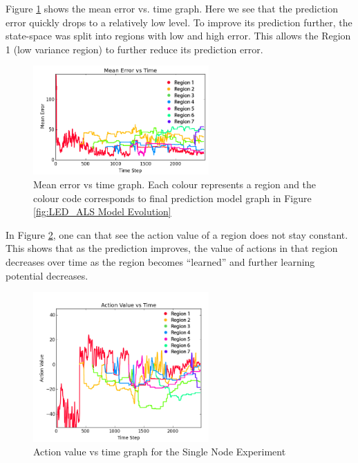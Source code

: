 Figure \ref{fig:LED_ALS Mean Error vs Time} shows the mean error vs. time graph. Here we see that the prediction error quickly drops to a relatively low level. To improve its prediction further, the state-space was split into regions with low and high error. This allows the Region 1 (low variance region) to further reduce its prediction error.

\begin{figure} 
	\centering
	\includegraphics[width=0.6\textwidth]{"fig/validations/LED_ALS Mean Error vs Time"}
	\caption[Mean error vs time graph]{Mean error vs time graph. Each colour represents a region and the colour code corresponds to final prediction model graph in Figure \ref{fig:LED_ALS Model Evolution} }
	\label{fig:LED_ALS Mean Error vs Time}
\end{figure}


In Figure \ref{fig:LED_ALS Action Value vs Time}, one can that see the action value of a region does not stay constant. This shows that as the prediction improves, the value of actions in that region decreases over time as the region becomes “learned” and further learning potential decreases. 


\begin{figure}
	\centering
	\includegraphics[width=0.6\textwidth]{"fig/validations/LED_ALS Action Value vs Time"}
	\caption{Action value vs time graph for the Single Node Experiment}
	\label{fig:LED_ALS Action Value vs Time}
\end{figure}


